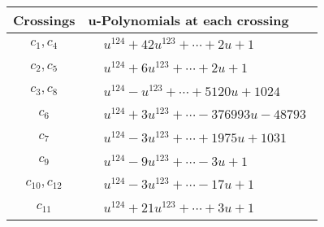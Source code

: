 \documentclass[1p]{elsarticle_modified}
\theoremstyle{definition}
\begin{document}
\begin{tabular}{m{50pt}|m{274pt}}
Crossings & \hspace{64pt}u-Polynomials at each crossing \\
\hline $$\begin{aligned}c_{1},c_{4}\end{aligned}$$&$\begin{aligned}
&u^{124}+42 u^{123}+\cdots+2 u+1
\end{aligned}$\\
\hline $$\begin{aligned}c_{2},c_{5}\end{aligned}$$&$\begin{aligned}
&u^{124}+6 u^{123}+\cdots+2 u+1
\end{aligned}$\\
\hline $$\begin{aligned}c_{3},c_{8}\end{aligned}$$&$\begin{aligned}
&u^{124}- u^{123}+\cdots+5120 u+1024
\end{aligned}$\\
\hline $$\begin{aligned}c_{6}\end{aligned}$$&$\begin{aligned}
&u^{124}+3 u^{123}+\cdots-376993 u-48793
\end{aligned}$\\
\hline $$\begin{aligned}c_{7}\end{aligned}$$&$\begin{aligned}
&u^{124}-3 u^{123}+\cdots+1975 u+1031
\end{aligned}$\\
\hline $$\begin{aligned}c_{9}\end{aligned}$$&$\begin{aligned}
&u^{124}-9 u^{123}+\cdots-3 u+1
\end{aligned}$\\
\hline $$\begin{aligned}c_{10},c_{12}\end{aligned}$$&$\begin{aligned}
&u^{124}-3 u^{123}+\cdots-17 u+1
\end{aligned}$\\
\hline $$\begin{aligned}c_{11}\end{aligned}$$&$\begin{aligned}
&u^{124}+21 u^{123}+\cdots+3 u+1
\end{aligned}$\\
\hline
\end{tabular}\\~\\
\end{document}

